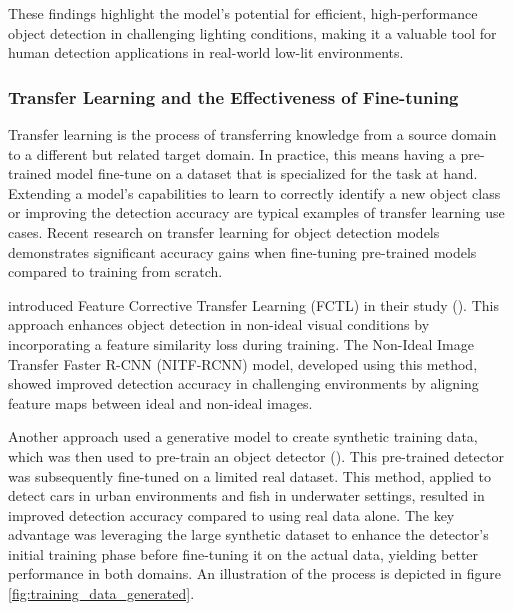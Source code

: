 These findings highlight the model's potential for efficient, high-performance object detection in challenging lighting conditions, making it a valuable tool for human detection applications in real-world low-lit environments.

\subsubsection{Transfer Learning and the Effectiveness of Fine-tuning}
\label{sec:transfer_learning_fine_tuning}
Transfer learning is the process of transferring knowledge from a source domain to a different but related target domain. In practice, this means having a pre-trained model fine-tune on a dataset that is specialized for the task at hand. Extending a model's capabilities to learn to correctly identify a new object class or improving the detection accuracy are typical examples of transfer learning use cases. Recent research on transfer learning for object detection models demonstrates significant accuracy gains when fine-tuning pre-trained models compared to training from scratch. 

\citeauthor{Wei2024FeatureCorrective} introduced Feature Corrective Transfer Learning (FCTL) in their study (\citeyear{Wei2024FeatureCorrective}). 
This approach enhances object detection in non-ideal visual conditions by incorporating a feature similarity loss during training. The Non-Ideal 
Image Transfer Faster R-CNN (NITF-RCNN) model, developed using this method, showed improved detection accuracy in challenging environments by 
aligning feature maps between ideal and non-ideal images.

Another approach used a generative model to create synthetic training data, which was then used to pre-train an object detector (\cite{TransferLearningGenerative2023}). This pre-trained detector was subsequently fine-tuned on a limited real dataset. This method, applied to detect cars in urban environments and fish in underwater settings, resulted in improved detection accuracy compared to using real data alone. The key advantage was leveraging the large synthetic dataset to enhance the detector's initial training phase before fine-tuning it on the actual data, yielding better performance in both domains. An illustration of the process is depicted in figure \ref{fig:training_data_generated}.

